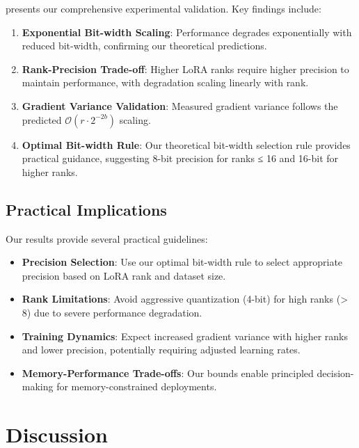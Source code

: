 \documentclass[10pt,twocolumn]{article}
\begin{document}
 presents our comprehensive experimental validation. Key findings include:

\begin{enumerate}
\item \textbf{Exponential Bit-width Scaling}: Performance degrades exponentially with reduced bit-width, confirming our theoretical predictions.

\item \textbf{Rank-Precision Trade-off}: Higher LoRA ranks require higher precision to maintain performance, with degradation scaling linearly with rank.

\item \textbf{Gradient Variance Validation}: Measured gradient variance follows the predicted $\mathcal{O}(r \cdot 2^{-2b})$ scaling.

\item \textbf{Optimal Bit-width Rule}: Our theoretical bit-width selection rule provides practical guidance, suggesting 8-bit precision for ranks ≤ 16 and 16-bit for higher ranks.
\end{enumerate}

\subsection{Practical Implications}

Our results provide several practical guidelines:

\begin{itemize}
\item \textbf{Precision Selection}: Use our optimal bit-width rule to select appropriate precision based on LoRA rank and dataset size.

\item \textbf{Rank Limitations}: Avoid aggressive quantization (4-bit) for high ranks (> 8) due to severe performance degradation.

\item \textbf{Training Dynamics}: Expect increased gradient variance with higher ranks and lower precision, potentially requiring adjusted learning rates.

\item \textbf{Memory-Performance Trade-offs}: Our bounds enable principled decision-making for memory-constrained deployments.
\end{itemize}

\section{Discussion}
\end{document}
